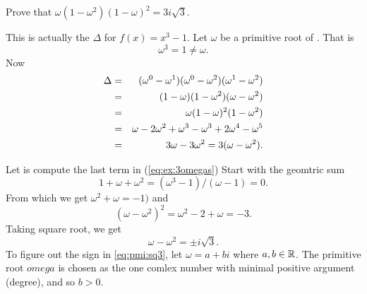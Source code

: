 \begin{myenumerate}

\item
\begin{excopy}
 Prove \label{ex:omega}
that \(\omega(1 - \omega^2)(1-\omega)^2 = 3i\sqrt{3}\).
\end{excopy}

This is actually the \(\Delta\) for \(f(x) = x^3 - 1\).
Let \(\omega\) be a primitive root of \fx. That is
\begin{equation}
\omega^3=1\neq\omega. \label{eq:omega:def}
\end{equation}
Now
\begin{eqnarray}
\Delta & = & (\omega^0 - \omega^1)(\omega^0 - \omega^2)(\omega^1 - \omega^2)
                                                                      \notag\\
 & = & (1 - \omega)(1 - \omega^2)(\omega - \omega^2) \notag\\
 & = & \omega(1 - \omega)^2(1 - \omega^2) \label{eq:ex:delta:omega} \\
 & = & \omega - 2\omega^2 + \omega^3 - \omega^3 + 2\omega^4 - \omega^5 \notag\\
 & = & 3\omega - 3\omega^2 = 3(\omega -  \omega^2). \label{eq:ex:3omegas}
\end{eqnarray}

Let is compute the last term in (\ref{eq:ex:3omegas})
Start with the geomtric sum
\begin{equation*}
1+\omega+\omega^2 = (\omega^3 - 1)/ (\omega - 1) = 0.
\end{equation*}
From which we get \(\omega^2+\omega = -1)\) and
\begin{equation*}
\left(\omega - \omega^2\right)^2 = \omega^2 - 2 + \omega = -3.
\end{equation*}
Taking square root, we get
\begin{equation}
\omega - \omega^2 = \pm i\sqrt{3}. \label{eq:pmi:sq3}
\end{equation}
To figure out the sign in \ref{eq:pmi:sq3}, let \(\omega = a+bi\)
where \(a,b\in\mathbb{R}\). The primitive root \(omega\) is chosen
as the one comlex number with minimal positive argument (degree),
and so \(b>0\).


\end{myenumerate}
